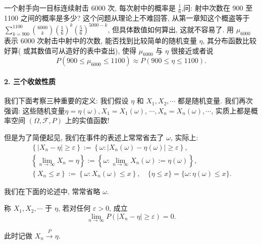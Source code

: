 \begin{example}
    一个射手向一目标连续射击 6000 次, 每次射中的概率是 $\frac{1}{6}$,问: 射中次数在 900 至 1100 之间的概率是多少? 这个问题从理论上不难回答, 从第一章知这个概盗等于 $\sum_{k=900}^{1100} {6000\choose k}\left(\frac{1}{6}\right)^k\left(\frac{5}{6}\right)^{5000-k}$, 但具体数值如何算出, 这就不容易了. 用 $\mu_{6000}$ 表示 6000 次射击中射中的次数, 能否找到比较简单的随机变量 $\eta$, 其分布函数比较好算( 或其数值可从造好的表中查出), 使得 $\mu_{6000}$ 与 $\eta$ 很接近或者说
$$
P\left(900 \leq \mu_{6000} \leq 1100\right) \approx P(900 \leq \eta \leq 1100) .
$$
\end{example}

\paragraph{2. 三个收敛性质} 我们下面考察三种重要的定义: 我们假设 $\eta$ 和 $X_1, X_2, \cdots$ 都是随机变量. 我们再次强调: 这些随机变量$\eta=\eta(\omega), X_1=X_1(\omega)$, $\cdots, X_n=X_n(\omega), \cdots$, 实质上都是概率空间 $(\Omega, \mathscr{F}, P)$ 上的实值函数!

但是为了简便起见, 我们在事件的表述上常常省去了 $\omega$, 实际上:
$$
\begin{gathered}
\left\{\left|X_n-\eta\right| \geq \varepsilon\right\}:=\left\{\omega:\left|X_n(\omega)-\eta(\omega)\right| \geq \varepsilon\right\}, \\
\left\{\lim _{n \rightarrow \infty} X_n=\eta\right\}:=\left\{\omega: \lim _{n \rightarrow \infty} X_n(\omega):=\eta(\omega)\right\}, \\
\left\{X_n \leq x\right\}:=\left\{\omega: X_n(\omega) \leq x\right\}, \quad\{\eta \leq x\}=\{\omega: \eta(\omega) \leq x\} .
\end{gathered}
$$

我们在下面的论述中, 常常省略 $\omega$.

\begin{center}
\end{center}

\begin{definition}
    称 $X_1, X_2, \cdots$ 于 $\eta$, 若对任何 $\varepsilon>0$, 成立
$$
\lim _{n \rightarrow \infty} P\left(\left|X_n-\eta\right| \geq \varepsilon\right)=0 .
$$

此时记做 $X_n \stackrel{P}{\longrightarrow} \eta$.
\end{definition}

